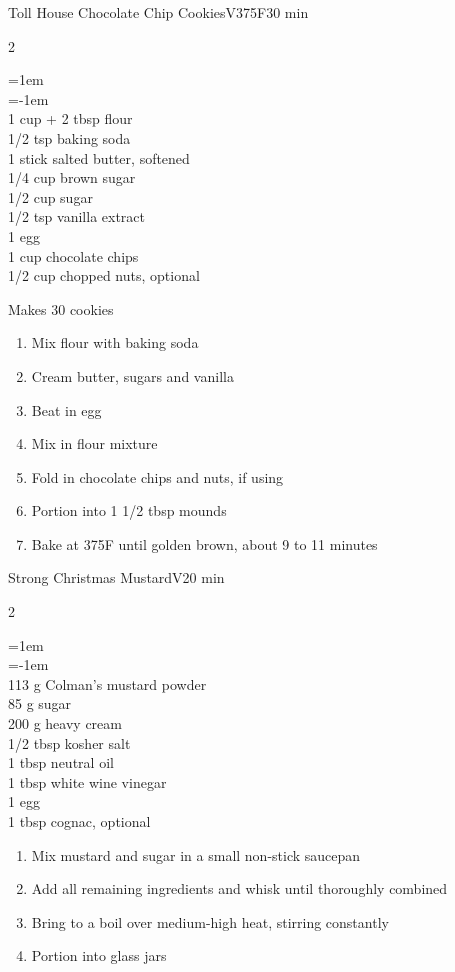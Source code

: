 \documentclass{article}
\newenvironment{recipe}[3][]
    {\begin{cardbase}[#1]{#2}{#3}
    \columnratio{0.333}
    \begin{paracol}{2}}
    {\end{paracol}\end{cardbase}}
\newcommand{\nextcolumn}{\switchcolumn}
\newenvironment{ingredients}
    {
    \begin{obeylines}
    \vspace{\parskip}
    \setlength{\parskip}{0.25em}
    \vspace{-0.25em}
    \leftskip=1em
    \parindent=-1em}
    {\end{obeylines}}
\newenvironment{steps}
    {\begin{enumerate}[leftmargin=*,topsep=0pt]}
    {\end{enumerate}}
\newcommand{\fahrenheit}[1]{#1\textdegree{}F}
\newcommand{\tag}[1]{\hspace{1em}#1}
\newcommand{\symboltag}[2]{\tag{#1\hspace{0.4em}#2}}
\newcommand{\totaltime}[1]{\symboltag{\raisebox{-0.1em}{\small\StopWatchEnd}}{#1}}
\newcommand{\preheat}[1]{\symboltag{\Topbottomheat}{#1}}
\begin{document}
\begin{recipe}{Toll House Chocolate Chip Cookies}{\tag{V}\preheat{\fahrenheit{375}}\totaltime{30 min}}
\begin{ingredients}
1 cup + 2 tbsp flour
1/2 tsp baking soda
1 stick salted butter, softened
1/4 cup brown sugar
1/2 cup sugar
1/2 tsp vanilla extract
1 egg
1 cup chocolate chips
1/2 cup chopped nuts, optional
\end{ingredients}
\nextcolumn
Makes 30 cookies
\begin{steps}
    \item Mix flour with baking soda
    \item Cream butter, sugars and vanilla
    \item Beat in egg
    \item Mix in flour mixture
    \item Fold in chocolate chips and nuts, if using
    \item Portion into 1 1/2 tbsp mounds
    \item Bake at \fahrenheit{375} until golden brown, about 9 to 11 minutes
\end{steps}
\end{recipe}

\begin{recipe}{Strong Christmas Mustard}{\tag{V}\totaltime{20 min}}
\begin{ingredients}
113 g Colman's mustard powder
85 g sugar
200 g heavy cream
1/2 tbsp kosher salt
1 tbsp neutral oil
1 tbsp white wine vinegar
1 egg
1 tbsp cognac, \mbox{optional}
\end{ingredients}
\nextcolumn
\begin{steps}
    \item Mix mustard and sugar in a small non-stick saucepan
    \item Add all remaining ingredients and whisk until thoroughly combined
    \item Bring to a boil over medium-high heat, stirring constantly
    \item Portion into glass jars
\end{steps}
\end{recipe}
\end{document}
